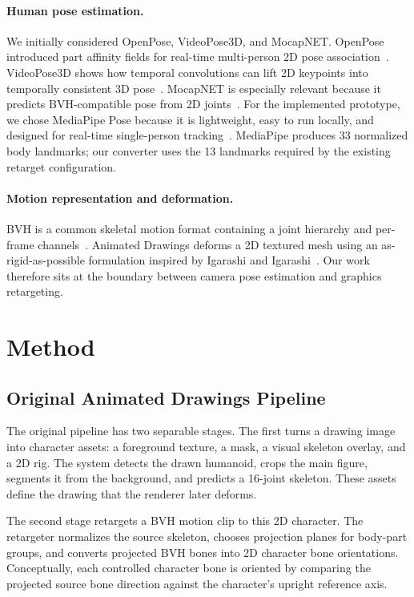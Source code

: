 \documentclass[10pt,twocolumn,letterpaper]{article}
\begin{document}
\paragraph{Human pose estimation.}
We initially considered OpenPose, VideoPose3D, and MocapNET. OpenPose introduced part affinity fields for real-time multi-person 2D pose association~\cite{Cao2017OpenPose}. VideoPose3D shows how temporal convolutions can lift 2D keypoints into temporally consistent 3D pose~\cite{Pavllo2019VideoPose3D}. MocapNET is especially relevant because it predicts BVH-compatible pose from 2D joints~\cite{Qammaz2019MocapNET}. For the implemented prototype, we chose MediaPipe Pose because it is lightweight, easy to run locally, and designed for real-time single-person tracking~\cite{Lugaresi2019MediaPipe,Bazarevsky2020BlazePose,MediaPipePoseDocs}. MediaPipe produces 33 normalized body landmarks; our converter uses the 13 landmarks required by the existing retarget configuration.

\paragraph{Motion representation and deformation.}
BVH is a common skeletal motion format containing a joint hierarchy and per-frame channels~\cite{BlenderBVHDocs,CMUMocap}. Animated Drawings deforms a 2D textured mesh using an as-rigid-as-possible formulation inspired by Igarashi and Igarashi~\cite{Igarashi2009ARAP}. Our work therefore sits at the boundary between camera pose estimation and graphics retargeting.

\section{Method}

\subsection{Original Animated Drawings Pipeline}

The original pipeline has two separable stages. The first turns a drawing image into character assets: a foreground texture, a mask, a visual skeleton overlay, and a 2D rig. The system detects the drawn humanoid, crops the main figure, segments it from the background, and predicts a 16-joint skeleton. These assets define the drawing that the renderer later deforms.

The second stage retargets a BVH motion clip to this 2D character. The retargeter normalizes the source skeleton, chooses projection planes for body-part groups, and converts projected BVH bones into 2D character bone orientations. Conceptually, each controlled character bone is oriented by comparing the projected source bone direction against the character's upright reference axis.
\end{document}
